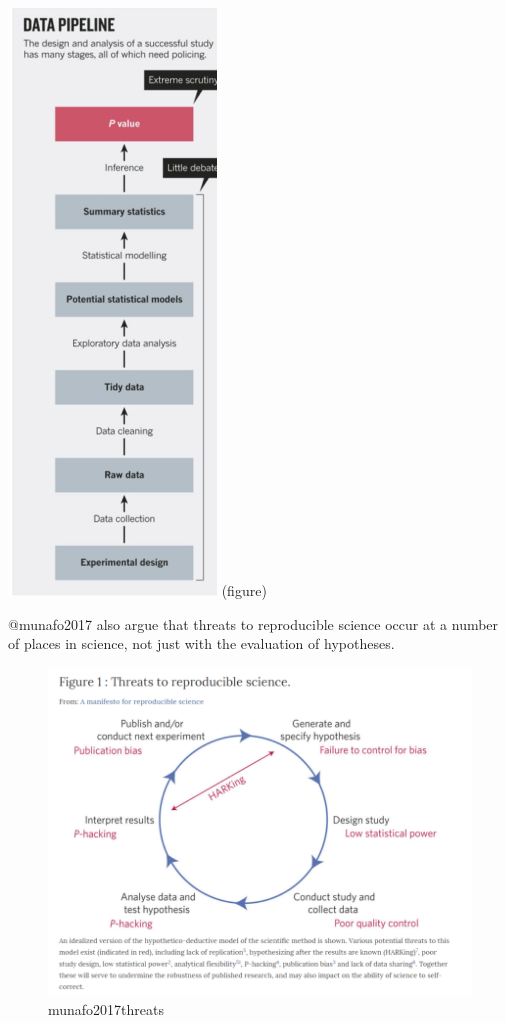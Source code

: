 \documentclass[
]{article}
\begin{document}
\includegraphics{images/leek2015pipeline.PNG} (figure)

@munafo2017 also argue that threats to reproducible science occur at a
number of places in science, not just with the evaluation of hypotheses.

\begin{figure}
\centering
\includegraphics{images/munafo2017threats.PNG}
\caption{munafo2017threats}
\end{figure}
\end{document}

